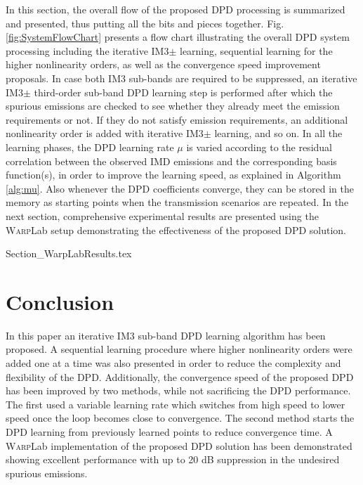 In this section, the overall flow of the proposed DPD processing is summarized and presented, thus putting all the bits and pieces together. Fig. \ref{fig:SystemFlowChart} presents a flow chart illustrating the overall DPD system processing including the iterative IM3$\pm$ learning, sequential learning for the higher nonlinearity orders, as well as the convergence speed improvement proposals. In case both IM3 sub-bands are required to be suppressed, an iterative IM3$\pm$ third-order sub-band DPD learning step is performed after which the spurious emissions are checked to see whether they already meet the emission requirements or not. If they do not satisfy emission requirements, an additional nonlinearity order is added with iterative IM3$\pm$ learning, and so on. In all the learning phases, the DPD learning rate $\mu$ is varied according to the residual correlation between the observed IMD emissions and the corresponding basis function(s), in order to improve the learning speed, as explained in Algorithm \ref{alg:mu}. Also whenever the DPD coefficients converge, they can be stored in the memory as starting points when the transmission scenarios are repeated. In the next section, comprehensive experimental results are presented using the \textsc{Warp}Lab setup demonstrating the effectiveness of the proposed DPD solution.

{Section_WarpLabResults.tex}

\section{Conclusion}
In this paper an iterative IM3 sub-band DPD learning algorithm has been proposed. A sequential learning procedure where higher nonlinearity orders were added one at a time was also presented in order to reduce the complexity and flexibility of the DPD. Additionally, the convergence speed of the proposed DPD has been improved by two methods, while not sacrificing the DPD performance. The first used a variable learning rate which switches from high speed to lower speed once the loop becomes close to convergence. The second method starts the DPD learning from previously learned points to reduce convergence time. A \textsc{Warp}Lab implementation of the proposed DPD solution has been demonstrated showing excellent performance with up to 20 dB suppression in the undesired spurious emissions.




